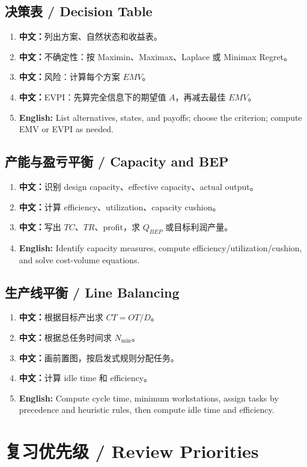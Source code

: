 \documentclass[11pt,a4paper]{ctexart}
\newcommand{\cn}[1]{\textbf{中文：}#1}
\newcommand{\en}[1]{\textbf{English:} #1}
\begin{document}
\subsection{决策表 / Decision Table}
\begin{enumerate}
  \item \cn{列出方案、自然状态和收益表。}
  \item \cn{不确定性：按 Maximin、Maximax、Laplace 或 Minimax Regret。}
  \item \cn{风险：计算每个方案 $EMV$。}
  \item \cn{EVPI：先算完全信息下的期望值 $A$，再减去最佳 $EMV$。}
  \item \en{List alternatives, states, and payoffs; choose the criterion; compute EMV or EVPI as needed.}
\end{enumerate}

\subsection{产能与盈亏平衡 / Capacity and BEP}
\begin{enumerate}
  \item \cn{识别 design capacity、effective capacity、actual output。}
  \item \cn{计算 efficiency、utilization、capacity cushion。}
  \item \cn{写出 $TC$、$TR$、profit，求 $Q_{BEP}$ 或目标利润产量。}
  \item \en{Identify capacity measures, compute efficiency/utilization/cushion, and solve cost-volume equations.}
\end{enumerate}

\subsection{生产线平衡 / Line Balancing}
\begin{enumerate}
  \item \cn{根据目标产出求 $CT=OT/D$。}
  \item \cn{根据总任务时间求 $N_{\min}$。}
  \item \cn{画前置图，按启发式规则分配任务。}
  \item \cn{计算 idle time 和 efficiency。}
  \item \en{Compute cycle time, minimum workstations, assign tasks by precedence and heuristic rules, then compute idle time and efficiency.}
\end{enumerate}

\section{复习优先级 / Review Priorities}
\end{document}
